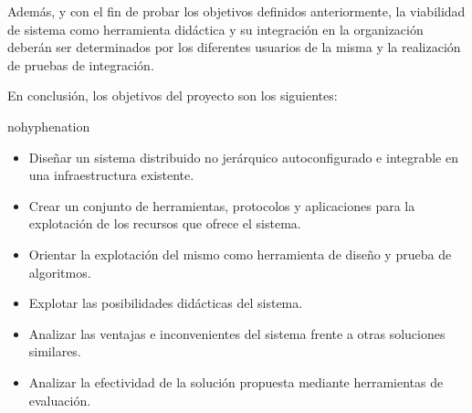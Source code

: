 Además, y con el fin de probar los objetivos definidos anteriormente, la viabilidad de sistema como herramienta didáctica y su integración en la organización deberán ser determinados por los diferentes usuarios de la misma y la realización de pruebas de integración.

\vspace{2cm}

En conclusión, los objetivos del proyecto son los siguientes:

\begin{hyphenrules}{nohyphenation}
\begin{center}
\itshape
\begin{itemize}
	\item[] Diseñar un sistema distribuido no jerárquico autoconfigurado e integrable en una infraestructura existente.
	\item[] Crear un conjunto de herramientas, protocolos y aplicaciones para la explotación de los recursos que ofrece el sistema.
	\item[] Orientar la explotación del mismo como herramienta de diseño y prueba de algoritmos.
	\item[] Explotar las posibilidades didácticas del sistema.
	\item[] Analizar las ventajas e inconvenientes del sistema frente a otras soluciones similares.
	\item[] Analizar la efectividad de la solución propuesta mediante herramientas de evaluación.
\end{itemize}
\end{center}
\end{hyphenrules}